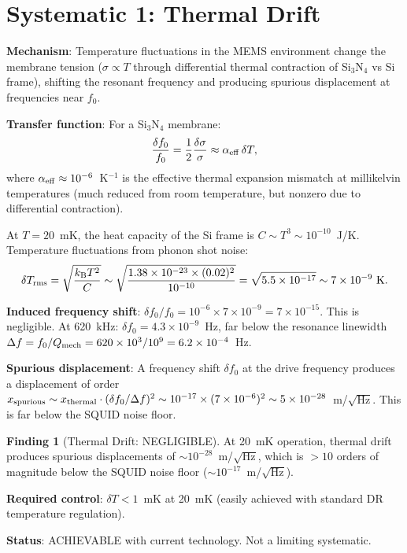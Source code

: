\documentclass[11pt]{article}
\newcommand{\ee}[1]{\times 10^{#1}}
\newcommand{\kB}{k_{\mathrm{B}}}
\newcommand{\Qmech}{Q_{\rm mech}}
\theoremstyle{definition}
\newtheorem{finding}[theorem]{Finding}
\theoremstyle{remark}
\begin{document}
\section{Systematic 1: Thermal Drift}
\label{sec:thermal_drift}

\textbf{Mechanism}: Temperature fluctuations in the MEMS environment
change the membrane tension ($\sigma \propto T$ through differential
thermal contraction of Si$_3$N$_4$ vs Si frame), shifting the
resonant frequency and producing spurious displacement at frequencies
near $f_0$.

\textbf{Transfer function}: For a Si$_3$N$_4$ membrane:
\begin{equation}
\frac{\delta f_0}{f_0} = \frac{1}{2}\frac{\delta\sigma}{\sigma}
\approx \alpha_{\rm eff}\,\delta T,
\end{equation}
where $\alpha_{\rm eff} \approx 10^{-6}$~K$^{-1}$ is the effective
thermal expansion mismatch at millikelvin temperatures (much reduced
from room temperature, but nonzero due to differential contraction).

At $T = 20$~mK, the heat capacity of the Si frame is
$C \sim T^3 \sim 10^{-10}$~J/K. Temperature fluctuations from
phonon shot noise:
\begin{equation}
\delta T_{\rm rms} = \sqrt{\frac{\kB T^2}{C}}
\sim \sqrt{\frac{1.38\ee{-23}\times(0.02)^2}{10^{-10}}}
= \sqrt{5.5\ee{-17}} \sim 7\ee{-9}~\text{K}.
\end{equation}

\textbf{Induced frequency shift}: $\delta f_0/f_0 = 10^{-6}\times
7\ee{-9} = 7\ee{-15}$. This is negligible. At 620~kHz:
$\delta f_0 = 4.3\ee{-9}$~Hz, far below the resonance linewidth
$\Delta f = f_0/\Qmech = 620\ee{3}/10^9 = 6.2\ee{-4}$~Hz.

\textbf{Spurious displacement}: A frequency shift $\delta f_0$ at
the drive frequency produces a displacement of order
$x_{\rm spurious} \sim x_{\rm thermal}\cdot(\delta f_0/\Delta f)^2
\sim 10^{-17}\times(7\ee{-6})^2 \sim 5\ee{-28}$~m/$\sqrt{\text{Hz}}$.
This is far below the SQUID noise floor.

\begin{finding}[Thermal Drift: NEGLIGIBLE]
\label{find:thermal}
At 20~mK operation, thermal drift produces spurious displacements
of $\sim 10^{-28}$~m/$\sqrt{\text{Hz}}$, which is $>10$ orders of
magnitude below the SQUID noise floor ($\sim 10^{-17}$~m/$\sqrt{\text{Hz}}$).

\textbf{Required control}: $\delta T < 1$~mK at 20~mK (easily
achieved with standard DR temperature regulation).

\textbf{Status}: \textcolor{strongcolor}{ACHIEVABLE with current
technology. Not a limiting systematic.}
\end{finding}
\end{document}
